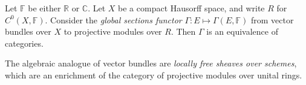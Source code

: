 \begin{theorem}
  Let $\mathbb F$ be either $\mathbb R$ or $\mathbb C$.
  Let $X$ be a compact Hausorff space, and write $R$ for $C^0(X,\mathbb F)$. Consider the \emph{global sections functor} 
  $\Gamma : E \mapsto \Gamma(E,\mathbb F)$ from vector bundles over $X$ to projective modules over $R$.
  Then $\Gamma$ is an equivalence of categories.
\end{theorem}

The algebraic analogue of vector bundles are \emph{locally free sheaves over schemes},
which are an enrichment of the category of projective modules over unital rings.

